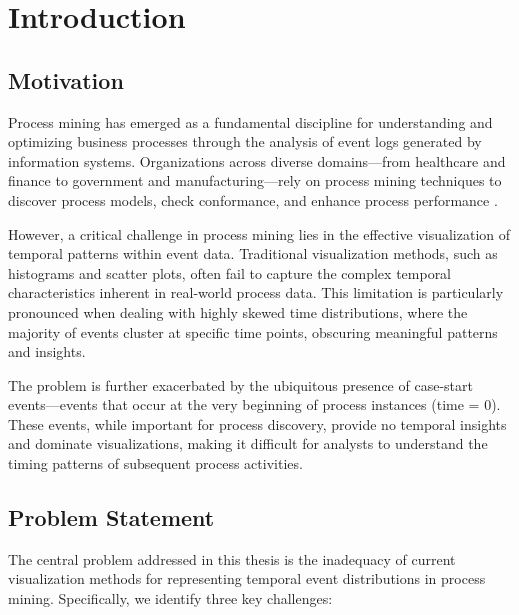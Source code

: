 
\chapter{Introduction}
\label{ch:introduction}

\section{Motivation}
\label{sec:motivation}

Process mining has emerged as a fundamental discipline for understanding and optimizing business processes through the analysis of event logs generated by information systems. Organizations across diverse domains—from healthcare and finance to government and manufacturing—rely on process mining techniques to discover process models, check conformance, and enhance process performance \cite{vanderaalst2016process}.

However, a critical challenge in process mining lies in the effective visualization of temporal patterns within event data. Traditional visualization methods, such as histograms and scatter plots, often fail to capture the complex temporal characteristics inherent in real-world process data. This limitation is particularly pronounced when dealing with highly skewed time distributions, where the majority of events cluster at specific time points, obscuring meaningful patterns and insights.

The problem is further exacerbated by the ubiquitous presence of case-start events—events that occur at the very beginning of process instances (time = 0). These events, while important for process discovery, provide no temporal insights and dominate visualizations, making it difficult for analysts to understand the timing patterns of subsequent process activities.

\section{Problem Statement}
\label{sec:problem_statement}

The central problem addressed in this thesis is the inadequacy of current visualization methods for representing temporal event distributions in process mining. Specifically, we identify three key challenges:

